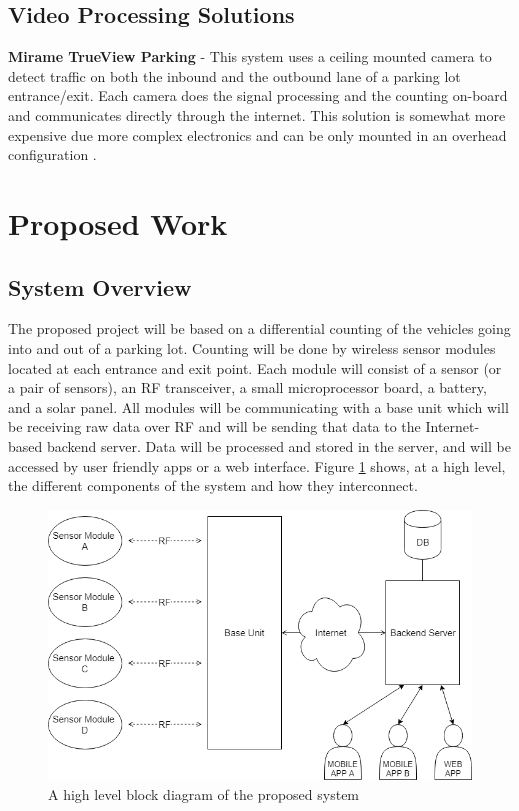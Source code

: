 \documentclass[letterpaper,10 pt,conference,onecolumn]{IEEEtran}
\begin{document}
		\subsection{Video Processing Solutions}
			\textbf{Mirame TrueView Parking} - This system uses a ceiling mounted camera to detect traffic on both the inbound and the outbound lane of a parking lot entrance/exit. Each camera does the signal processing and the counting on-board and communicates directly through the internet. This solution is somewhat more expensive due more complex electronics and can be only mounted in an overhead configuration \cite{trueview}.
	
	\section{Proposed Work}
		\subsection{System Overview}
			The proposed project will be based on a differential counting of the vehicles going into and out of a parking lot. Counting will be done by wireless sensor modules located at each entrance and exit point. Each module will consist of a sensor (or a pair of sensors), an RF transceiver, a small microprocessor board, a battery, and a solar panel. All modules will be communicating with a base unit which will be receiving raw data over RF and will be sending that data to the Internet-based backend server. Data will be processed and stored in the server, and will be accessed by user friendly apps or a web interface. Figure \ref{fig:overview} shows, at a high level, the different components of the system and how they interconnect.
			
			\begin{figure}[h]
				\centering
				\includegraphics[width=0.65\columnwidth]{overview}
				\caption{A high level block diagram of the proposed system}
				\label{fig:overview}
			\end{figure}
		
\end{document}
